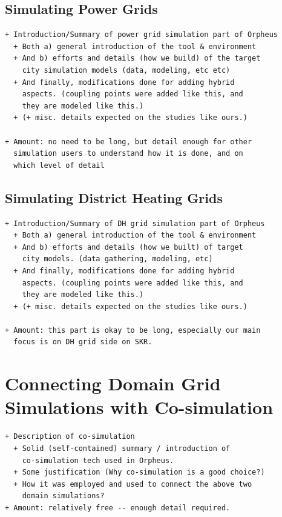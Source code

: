 \documentclass[review]{elsarticle}
\begin{document}
\subsection{Simulating Power Grids} 
\label{sec:power_sim}
\begin{verbatim}
+ Introduction/Summary of power grid simulation part of Orpheus
  + Both a) general introduction of the tool & environment 
  + And b) efforts and details (how we build) of the target 
    city simulation models (data, modeling, etc etc) 
  + And finally, modifications done for adding hybrid 
    aspects. (coupling points were added like this, and 
    they are modeled like this.) 
  + (+ misc. details expected on the studies like ours.) 

+ Amount: no need to be long, but detail enough for other 
  simulation users to understand how it is done, and on 
  which level of detail 
\end{verbatim}

\subsection{Simulating District Heating Grids}
\label{sec:heat_sim}
\begin{verbatim}
+ Introduction/Summary of DH grid simulation part of Orpheus 
  + Both a) general introduction of the tool & environment 
  + And b) efforts and details (how we built) of target 
    city models. (data gathering, modeling, etc) 
  + And finally, modifications done for adding hybrid 
    aspects. (coupling points were added like this, and 
    they are modeled like this.) 
  + (+ misc. details expected on the studies like ours.) 

+ Amount: this part is okay to be long, especially our main 
  focus is on DH grid side on SKR. 
\end{verbatim}
\section{Connecting Domain Grid Simulations with Co-simulation}
\label{sec:cosim}
\begin{verbatim}
+ Description of co-simulation 
  + Solid (self-contained) summary / introduction of 
    co-simulation tech used in Orpheus. 
  + Some justification (Why co-simulation is a good choice?) 
  + How it was employed and used to connect the above two 
    domain simulations? 
+ Amount: relatively free -- enough detail required. 
\end{verbatim}
\end{document}
